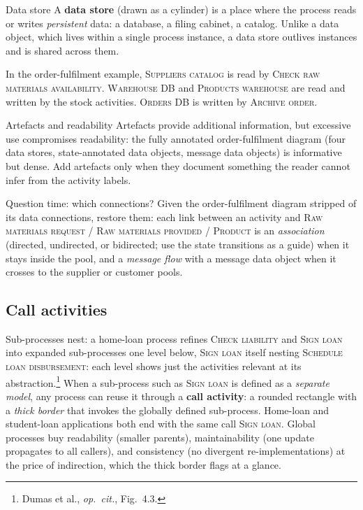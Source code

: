 \begin{definitionbox}{Data store}
A \textbf{data store} (drawn as a cylinder) is a place where the process reads or writes \emph{persistent} data: a database, a filing cabinet, a catalog. Unlike a data object, which lives within a single process instance, a data store outlives instances and is shared across them.
\end{definitionbox}

In the order-fulfilment example, \textsc{Suppliers catalog} is read by \textsc{Check raw materials availability}. \textsc{Warehouse DB} and \textsc{Products warehouse} are read and written by the stock activities. \textsc{Orders DB} is written by \textsc{Archive order}.

\begin{notebox}{Artefacts and readability}
Artefacts provide additional information, but excessive use compromises readability: the fully annotated order-fulfilment diagram (four data stores, state-annotated data objects, message data objects) is informative but dense. Add artefacts only when they document something the reader cannot infer from the activity labels.
\end{notebox}

\begin{examplebox}{Question time: which connections?}
Given the order-fulfilment diagram stripped of its data connections, restore them: each link between an activity and \textsc{Raw materials request} / \textsc{Raw materials provided} / \textsc{Product} is an \emph{association} (directed, undirected, or bidirected; use the state transitions as a guide) when it stays inside the pool, and a \emph{message flow} with a message data object when it crosses to the supplier or customer pools.
\end{examplebox}

\subsection{Call activities}

Sub-processes nest: a home-loan process refines \textsc{Check liability} and \textsc{Sign loan} into expanded sub-processes one level below, \textsc{Sign loan} itself nesting \textsc{Schedule loan disbursement}: each level shows just the activities relevant at its abstraction.\footnote{Dumas et al., \emph{op.~cit.}, Fig.~4.3.} When a sub-process such as \textsc{Sign loan} is defined as a \emph{separate model}, any process can reuse it through a \textbf{call activity}: a rounded rectangle with a \emph{thick border} that invokes the globally defined sub-process. Home-loan and student-loan applications both end with the same call \textsc{Sign loan}. Global processes buy readability (smaller parents), maintainability (one update propagates to all callers), and consistency (no divergent re-implementations) at the price of indirection, which the thick border flags at a glance.

